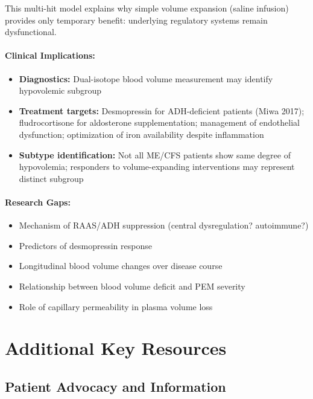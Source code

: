 This multi-hit model explains why simple volume expansion (saline infusion) provides only temporary benefit: underlying regulatory systems remain dysfunctional.

\paragraph{Clinical Implications:}
\begin{itemize}
    \item \textbf{Diagnostics:} Dual-isotope blood volume measurement may identify hypovolemic subgroup
    \item \textbf{Treatment targets:} Desmopressin for ADH-deficient patients (Miwa 2017); fludrocortisone for aldosterone supplementation; management of endothelial dysfunction; optimization of iron availability despite inflammation
    \item \textbf{Subtype identification:} Not all ME/CFS patients show same degree of hypovolemia; responders to volume-expanding interventions may represent distinct subgroup
\end{itemize}

\paragraph{Research Gaps:}
\begin{itemize}
    \item Mechanism of RAAS/ADH suppression (central dysregulation? autoimmune?)
    \item Predictors of desmopressin response
    \item Longitudinal blood volume changes over disease course
    \item Relationship between blood volume deficit and PEM severity
    \item Role of capillary permeability in plasma volume loss
\end{itemize}

\section{Additional Key Resources}
\label{sec:bib-resources}

\subsection{Patient Advocacy and Information}

